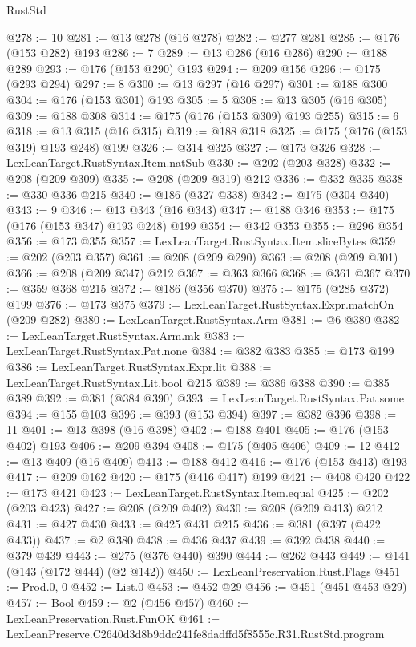 \begin{lexlean}{RustStd}
\begin{coremodule}
@278 := 10
@281 := @13 @278 (@16 @278)
@282 := @277 @281
@285 := @176 (@153 @282) @193
@286 := 7
@289 := @13 @286 (@16 @286)
@290 := @188 @289
@293 := @176 (@153 @290) @193
@294 := @209 @156
@296 := @175 (@293 @294)
@297 := 8
@300 := @13 @297 (@16 @297)
@301 := @188 @300
@304 := @176 (@153 @301) @193
@305 := 5
@308 := @13 @305 (@16 @305)
@309 := @188 @308
@314 := @175 (@176 (@153 @309) @193 @255)
@315 := 6
@318 := @13 @315 (@16 @315)
@319 := @188 @318
@325 := @175 (@176 (@153 @319) @193 @248) @199
@326 := @314 @325
@327 := @173 @326
@328 := LexLeanTarget.RustSyntax.Item.natSub
@330 := @202 (@203 @328)
@332 := @208 (@209 @309)
@335 := @208 (@209 @319) @212
@336 := @332 @335
@338 := @330 @336 @215
@340 := @186 (@327 @338)
@342 := @175 (@304 @340)
@343 := 9
@346 := @13 @343 (@16 @343)
@347 := @188 @346
@353 := @175 (@176 (@153 @347) @193 @248) @199
@354 := @342 @353
@355 := @296 @354
@356 := @173 @355
@357 := LexLeanTarget.RustSyntax.Item.sliceBytes
@359 := @202 (@203 @357)
@361 := @208 (@209 @290)
@363 := @208 (@209 @301)
@366 := @208 (@209 @347) @212
@367 := @363 @366
@368 := @361 @367
@370 := @359 @368 @215
@372 := @186 (@356 @370)
@375 := @175 (@285 @372) @199
@376 := @173 @375
@379 := LexLeanTarget.RustSyntax.Expr.matchOn (@209 @282)
@380 := LexLeanTarget.RustSyntax.Arm
@381 := @6 @380
@382 := LexLeanTarget.RustSyntax.Arm.mk
@383 := LexLeanTarget.RustSyntax.Pat.none
@384 := @382 @383
@385 := @173 @199
@386 := LexLeanTarget.RustSyntax.Expr.lit
@388 := LexLeanTarget.RustSyntax.Lit.bool @215
@389 := @386 @388
@390 := @385 @389
@392 := @381 (@384 @390)
@393 := LexLeanTarget.RustSyntax.Pat.some
@394 := @155 @103
@396 := @393 (@153 @394)
@397 := @382 @396
@398 := 11
@401 := @13 @398 (@16 @398)
@402 := @188 @401
@405 := @176 (@153 @402) @193
@406 := @209 @394
@408 := @175 (@405 @406)
@409 := 12
@412 := @13 @409 (@16 @409)
@413 := @188 @412
@416 := @176 (@153 @413) @193
@417 := @209 @162
@420 := @175 (@416 @417) @199
@421 := @408 @420
@422 := @173 @421
@423 := LexLeanTarget.RustSyntax.Item.equal
@425 := @202 (@203 @423)
@427 := @208 (@209 @402)
@430 := @208 (@209 @413) @212
@431 := @427 @430
@433 := @425 @431 @215
@436 := @381 (@397 (@422 @433))
@437 := @2 @380
@438 := @436 @437
@439 := @392 @438
@440 := @379 @439
@443 := @275 (@376 @440) @390
@444 := @262 @443
@449 := @141 (@143 (@172 @444) (@2 @142))
@450 := LexLeanPreservation.Rust.Flags
@451 := Prod.{0, 0}
@452 := List.{0}
@453 := @452 @29
@456 := @451 (@451 @453 @29)
@457 := Bool
@459 := @2 (@456 @457)
@460 := LexLeanPreservation.Rust.FunOK
@461 := LexLeanPreserve.C2640d3d8b9ddc241fe8dadffd5f8555c.R31.RustStd.program

\end{coremodule}
\end{lexlean}
